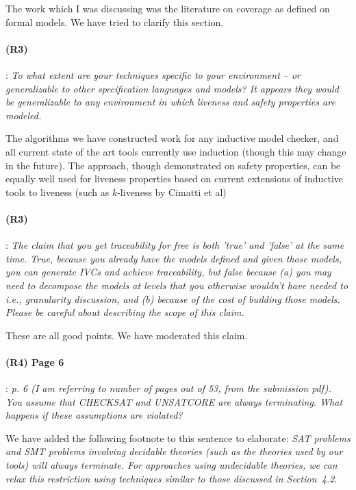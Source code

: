 \documentclass{article}
\begin{document}
The work which I was discussing was the literature on coverage as defined on formal models.  We have tried to clarify this section. 

\paragraph{(R3)}: \textit{To what extent are your techniques specific to your environment -- or generalizable to other specification languages and models? It appears they would be generalizable to any environment in which liveness and safety properties are modeled.}
\vspace{0.05in}

The algorithms we have constructed work for any inductive model checker, and all current state of the art tools currently use induction (though this may change in the future).  The approach, though demonstrated on safety properties, can be equally well used for liveness properties based on current extensions of inductive tools to liveness (such as $k$-liveness by Cimatti et al)

\paragraph{(R3)}: \textit{The claim that you get traceability for free is both 'true' and 'false' at the same time. True, because you already have the models defined and given those models, you can generate IVCs and achieve traceability, but false because   (a) you may need to decompose the models at levels that you otherwise wouldn't have needed to i.e., granularity discussion, and  (b) because of the cost of building those models.   Please be careful about describing the scope of this claim.}
\vspace{0.05in}

These are all good points.  We have moderated this claim.

\paragraph{(R4) Page 6}: \textit{p. 6 (I am referring to number of pages out of 53, from the submission pdf). You assume that CHECKSAT and UNSATCORE are
always terminating. What happens if these assumptions are violated?}
\vspace{0.05in}

\noindent We have added the following footnote to this sentence to elaborate: \textit{SAT problems and SMT problems involving decidable theories (such as the theories used by our tools) will always terminate.  For approaches using undecidable theories, we can relax this restriction using  techniques similar to those discussed in Section~4.2}.
\end{document}
